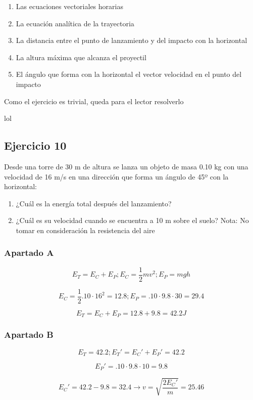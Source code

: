 \begin{enumerate}[label=\Alph*)]
  \item Las ecuaciones vectoriales horarias
  \item La ecuación analítica de la trayectoria
  \item La distancia entre el punto de
  lanzamiento y del impacto con la horizontal
  \item La altura máxima que alcanza el proyectil
  \item El ángulo que forma con la horizontal el vector
  velocidad en el punto del impacto
\end{enumerate}

Como el ejercicio es trivial, queda para el lector
resolverlo

lol

\subsection{Ejercicio 10}
Desde una torre de 30 m de altura se lanza un
objeto de masa 0.10 kg con una velocidad de
16 m/s en una dirección que forma un ángulo de
45º con la horizontal:

\begin{enumerate}[label=\Alph*)]
  \item ¿Cuál es la energía total después del lanzamiento?
  \item ¿Cuál es su velocidad cuando se encuentra a 10 m
  sobre el suelo? Nota: No tomar en consideración la
  resistencia del aire
\end{enumerate}

\subsubsection{Apartado A}
  $$
  E_T = E_C + E_P; E_C = \frac{1}{2}mv^2; E_P = mgh
  $$

  $$
  E_C = \frac{1}{2}.10\cdot16^2 = 12.8;
  E_P = .10\cdot9.8\cdot30 = 29.4
  $$

  $$
  E_T = E_C + E_P = 12.8 + 9.8 = 42.2J
  $$

\subsubsection{Apartado B}
  $$
  E_T = 42.2; E_T' = E_C' + E_P' = 42.2
  $$

  $$
  E_P' = .10\cdot9.8\cdot10 = 9.8
  $$

  $$
  E_C' = 42.2 - 9.8 = 32.4
  \rightarrow v = \sqrt{\frac{2E_C'}{m}} = 25.46
  $$

